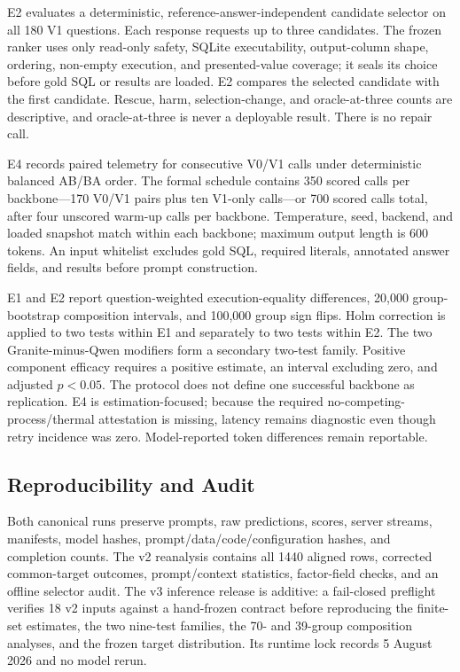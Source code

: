 \documentclass[applsci,article,submit,moreauthors]{Definitions/mdpi}
\begin{document}
E2 evaluates a deterministic, reference-answer-independent candidate selector on all 180 V1 questions. Each response requests up to three candidates. The frozen ranker uses only read-only safety, SQLite executability, output-column shape, ordering, non-empty execution, and presented-value coverage; it seals its choice before gold SQL or results are loaded. E2 compares the selected candidate with the first candidate. Rescue, harm, selection-change, and oracle-at-three counts are descriptive, and oracle-at-three is never a deployable result. There is no repair call.

E4 records paired telemetry for consecutive V0/V1 calls under deterministic balanced AB/BA order. The formal schedule contains 350 scored calls per backbone---170 V0/V1 pairs plus ten V1-only calls---or 700 scored calls total, after four unscored warm-up calls per backbone. Temperature, seed, backend, and loaded snapshot match within each backbone; maximum output length is 600 tokens. An input whitelist excludes gold SQL, required literals, annotated answer fields, and results before prompt construction.

E1 and E2 report question-weighted execution-equality differences, 20,000 group-bootstrap composition intervals, and 100,000 group sign flips. Holm correction is applied to two tests within E1 and separately to two tests within E2. The two Granite-minus-Qwen modifiers form a secondary two-test family. Positive component efficacy requires a positive estimate, an interval excluding zero, and adjusted $p<0.05$. The protocol does not define one successful backbone as replication. E4 is estimation-focused; because the required no-competing-process/thermal attestation is missing, latency remains diagnostic even though retry incidence was zero. Model-reported token differences remain reportable.

\subsection{Reproducibility and Audit}
Both canonical runs preserve prompts, raw predictions, scores, server streams, manifests, model hashes, prompt/data/code/configuration hashes, and completion counts. The v2 reanalysis contains all 1440 aligned rows, corrected common-target outcomes, prompt/context statistics, factor-field checks, and an offline selector audit. The v3 inference release is additive: a fail-closed preflight verifies 18 v2 inputs against a hand-frozen contract before reproducing the finite-set estimates, the two nine-test families, the 70- and 39-group composition analyses, and the frozen target distribution. Its runtime lock records 5 August 2026 and no model rerun.
\end{document}
